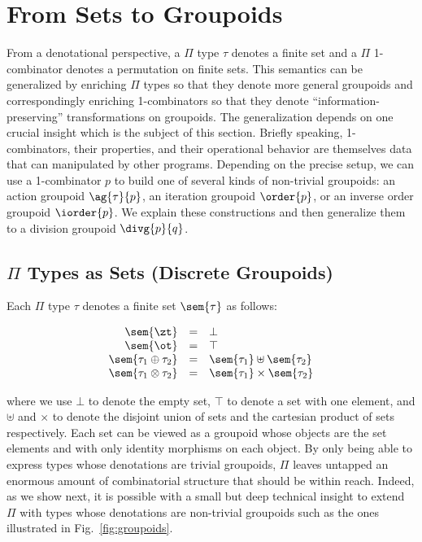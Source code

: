 \section{From Sets to Groupoids} 
\label{sec:groupoids}

From a denotational perspective, a $\Pi$ type $\tau$ denotes a finite
set and a $\Pi$ 1-combinator denotes a permutation on finite
sets. This semantics can be generalized by enriching $\Pi$ types so
that they denote more general groupoids and correspondingly enriching
1-combinators so that they denote ``information-preserving''
transformations on groupoids. The generalization depends on one
crucial insight which is the subject of this section. Briefly
speaking, 1-combinators, their properties, and their operational
behavior are themselves data that can manipulated by other
programs. Depending on the precise setup, we can use a 1-combinator
$p$ to build one of several kinds of non-trivial groupoids: an action
groupoid $\ag{\tau}{p}$, an iteration groupoid $\order{p}$, or an
inverse order groupoid $\iorder{p}$. We explain these constructions
and then generalize them to a division groupoid $\divg{p}{q}$.

\subsection{$\Pi$ Types as Sets (Discrete Groupoids)}

Each $\Pi$ type $\tau$ denotes a finite set $\sem{\tau}$ as follows:

\[\begin{array}{rcl}
\sem{\zt} &=& \bot \\
\sem{\ot} &=& \top \\
\sem{\tau_1 \oplus \tau_2} &=& \sem{\tau_1} \uplus \sem{\tau_2} \\
\sem{\tau_1 \otimes \tau_2} &=& \sem{\tau_1} \times \sem{\tau_2}
\end{array}\]

\noindent where we use $\bot$ to denote the empty set, $\top$ to
denote a set with one element, and $\uplus$ and $\times$ to denote the
disjoint union of sets and the cartesian product of sets
respectively. Each set can be viewed as a groupoid whose objects are
the set elements and with only identity morphisms on each object. By
only being able to express types whose denotations are trivial
groupoids, $\Pi$ leaves untapped an enormous amount of combinatorial
structure that should be within reach. Indeed, as we show next, it is
possible with a small but deep technical insight to extend $\Pi$ with
types whose denotations are non-trivial groupoids such as the ones
illustrated in Fig.~\ref{fig:groupoids}.

